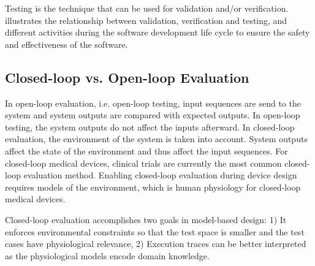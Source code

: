 Testing is the technique that can be used for validation and/or verification.  illustrates the relationship between validation, verification and testing, and different activities during the software development life cycle to ensure the safety and effectiveness of the software.
\subsection{Closed-loop vs. Open-loop Evaluation}
In open-loop evaluation, i.e. open-loop testing, input sequences are send to the system and system outputs are compared with expected outputs. 
In open-loop testing, the system outputs do not affect the inputs afterward. 
In closed-loop evaluation, the environment of the system is taken into account. 
System outputs affect the state of the environment and thus affect the input sequences. 
For closed-loop medical devices, clinical trials are currently the most common closed-loop evaluation method. 
Enabling closed-loop evaluation during device design requires models of the environment, which is human physiology for closed-loop medical devices.

Closed-loop evaluation accomplishes two goals in model-based design: 1) It enforces environmental constraints so that the test space is smaller and the test cases have physiological relevance, 2) Execution traces can be better interpreted as the physiological models encode domain knowledge. 

